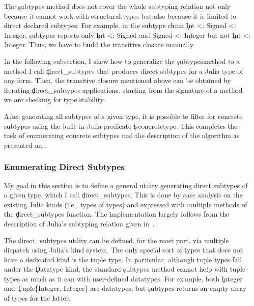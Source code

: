 The \c{subtypes} method does not cover the whole subtyping relation not only
because it cannot work with structural types but also because it is limited
to direct declared subtypes. For example, in the subtype chain
\c{Int <: Signed <: Integer}, \c{subtypes} reports only \c{Int <: Signed}
and \c{Signed <: Integer} but not \c{Int <: Integer}. Thus, we have to build
the transitive closure manually.

In the following subsection, I show how to generalize the \c{subtypes}\!\!method to
a method I call \c{direct_subtypes} that produces direct subtypes for a Julia
type of any form. Then, the transitive closure mentioned above can be
obtained by iterating \c{direct_subtypes} applications,
starting from the signature of a method we are checking for
type stability.

After generating all subtypes of a given type, it is possible to filter for concrete
subtypes using the built-in Julia predicate \c{isconcretetype}. This completes
the task of enumerating concrete subtypes and the description of the algorithm
as presented on .


\subsubsection{Enumerating Direct Subtypes}

My goal in this section is to define a general utility generating direct subtypes of a given
type, which I call \c{direct_subtypes}.
This is done by case analysis on the existing Julia kinds (i.e., types of types)
and expressed with multiple methods
of the \c{direct_subtypes} function. The implementation largely follows from the
description of Julia's subtyping relation given in~\cite{oopsla18b}.

The \c{direct_subtypes} utility can be defined, for the most part, via multiple dispatch
using Julia's kind system.
The only special sort of types that does not have a dedicated kind is the tuple type.
In particular, although tuple types fall under the \c{Datatype} kind,
the standard \c{subtypes} method cannot help with tuple types as much as it can with user-defined datatypes.
For example,
both \c{Integer} and \c{Tuple\{Integer, Integer\}} are datatypes, but
\c{subtypes} returns an empty array of types for the latter.

